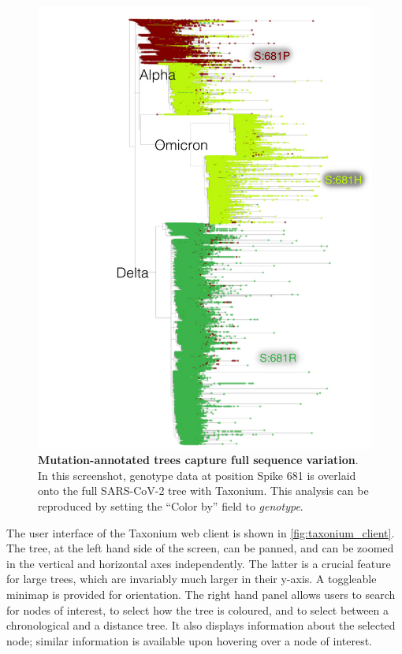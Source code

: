 \begin{figure}
\begin{center}
\includegraphics[width=0.9\linewidth]{Figures/681.pdf}
\end{center}
\caption{\textbf{Mutation-annotated trees capture full sequence variation}. In this screenshot, genotype data at position Spike 681  is overlaid onto the full SARS-CoV-2 tree with Taxonium. This analysis can be reproduced by setting the ``Color by'' field to \textit{genotype}.}
\label{fig:681}
\end{figure}

The user interface of the Taxonium web client is shown in \cref{fig:taxonium_client}. The tree, at the left hand side of the screen, can be panned, and can be zoomed in the vertical and horizontal axes independently. The latter is a crucial feature for large trees, which are invariably much larger in their y-axis. A toggleable minimap is provided for orientation. The right hand panel allows users to search for nodes of interest, to select how the tree is coloured, and to select between a chronological and a distance tree. It also displays information about the selected node; similar information is available upon hovering over a node of interest.



